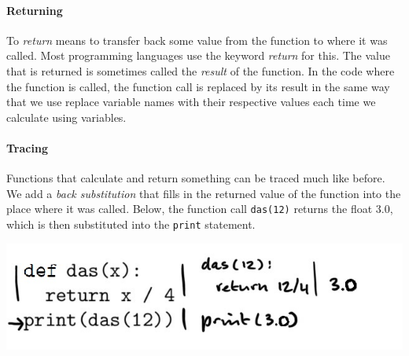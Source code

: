 \paragraph{Returning}

To \emph{return} means to transfer back some value from the function to where it was called. Most programming languages use the keyword \emph{return} for this. The value that is returned is sometimes called the \emph{result} of the function. In the code where the function is called, the function call is replaced by its result in the same way that we use replace variable names with their respective values each time we calculate using variables.

\paragraph{Tracing}

Functions that calculate and return something can be traced much like before. We add a \emph{back substitution} that fills in the returned value of the function into the place where it was called. Below, the function call \texttt{das(12)} returns the float 3.0, which is then substituted into the \texttt{print} statement.

\includegraphics[width=.7\textwidth]{6-trace-returns.jpeg}
